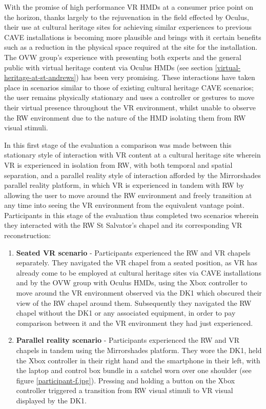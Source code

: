 With the promise of high performance VR HMDs at a consumer price point on the horizon, thanks largely to the rejuvenation in the field effected by Oculus, their use at cultural heritage sites for achieving similar experiences to previous CAVE installations is becoming more plausible and brings with it certain benefits such as a reduction in the physical space required at the site for the installation. The OVW group's experience with presenting both experts and the general public with virtual heritage content via Oculus HMDs (see section \ref{virtual-heritage-at-st-andrews}) has been very promising. These interactions have taken place in scenarios similar to those of existing cultural heritage CAVE scenarios; the user remains physically stationary and uses a controller or gestures to move their virtual presence throughout the VR environment, whilst unable to observe the RW environment due to the nature of the HMD isolating them from RW visual stimuli.

In this first stage of the evaluation a comparison was made between this stationary style of interaction with VR content at a cultural heritage site wherein VR is experienced in isolation from RW, with both temporal and spatial separation, and a parallel reality style of interaction afforded by the Mirrorshades parallel reality platform, in which VR is experienced in tandem with RW by allowing the user to move around the RW environment and freely transition at any time into seeing the VR environment from the equivalent vantage point. Participants in this stage of the evaluation thus completed two scenarios wherein they interacted with the RW St Salvator's chapel and its corresponding VR reconstruction:

\begin{enumerate}
	\item \textbf{Seated VR scenario} - Participants experienced the RW and VR chapels separately. They navigated the VR chapel from a seated position, as VR has already come to be employed at cultural heritage sites via CAVE installations and by the OVW group with Oculus HMDs, using the Xbox controller to move around the VR environment observed via the DK1 which obscured their view of the RW chapel around them. Subsequently they navigated the RW chapel without the DK1 or any associated equipment, in order to pay comparison between it and the VR environment they had just experienced.
	\item \textbf{Parallel reality scenario} - Participants experienced the RW and VR chapels in tandem using the Mirrorshades platform. They wore the DK1, held the Xbox controller in their right hand and the smartphone in their left, with the laptop and control box bundle in a satchel worn over one shoulder (see figure \ref{participant-f.jpg}). Pressing and holding a button on the Xbox controller triggered a transition from RW visual stimuli to VR visual displayed by the DK1.
\end{enumerate}

